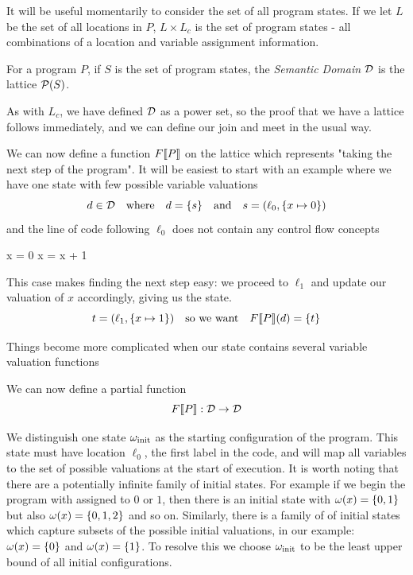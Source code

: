 It will be useful momentarily to consider the set of all program states.
If we let $L$ be the set of all locations in $P$, $L \times L_c$ is the set of program states - all combinations of a location and variable assignment information.

\begin{definition}
  For a program $P$, if $S$ is the set of program states, the \emph{Semantic Domain} $\mathcal{D}$ is the lattice $\mathcal{P}(S)$.
\end{definition}
As with $L_c$, we have defined $\mathcal{D}$ as a power set, so the proof that we have a lattice follows immediately, and we can define our join and meet in the usual way.

We can now define a function $F\llbracket P\rrbracket$ on the lattice which represents "taking the next step of the program".
It will be easiest to start with an example where we have one state with few possible variable valuations
\[
  d \in \mathcal{D} \quad \text{where} \quad d = \{s\} \quad \text{and} \quad s= ( \ell_0, \{x \mapsto 0\} )
\]
and the line of code following $\ell_0$ does not contain any control flow concepts 
\begin{code}
  x = 0
  x = x + 1
\end{code}
This case makes finding the next step easy: we proceed to $\ell_1$ and update our valuation of $x$ accordingly, giving us the state.
\[
  t = ( \ell_1, \{x \mapsto 1\} ) \quad \text{so we want} \quad F\llbracket P\rrbracket(d) = \{t\}
\]

Things become more complicated when our state contains several variable valuation functions



We can now define a partial function
\[
  F\llbracket P\rrbracket: \mathcal{D} \to \mathcal{D}
\]

We distinguish one state $\omega_{\text{init}}$ as the starting configuration of the program.
This state must have location $\ell_0$, the first label in the code, and will map all variables to the set of possible valuations at the start of execution.
It is worth noting that there are a potentially infinite family of initial states.
For example if we begin the program with  assigned to $0$ or $1$, then there is an initial state with $\omega(x) = \{0, 1\}$ but also $\omega(x) = \{0, 1, 2\}$ and so on.
Similarly, there is a family of of initial states which capture subsets of the possible initial valuations, in our example: $\omega(x) = \{0\}$ and $\omega(x) = \{1\}$.
To resolve this we choose $\omega_{\text{init}}$ to be the least upper bound of all initial configurations.

